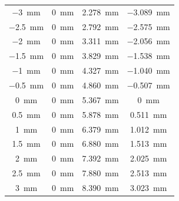 \begin{table}[ht]
\begin{tabular}{| c | c | c | c |}
        \hline


        \SI{-3}{mm}           & \SI{0}{mm}     & \SI{2.278}{mm}      & \SI{-3.089}{mm}   \\
        \SI{-2.5}{mm}         & \SI{0}{mm}     & \SI{2.792}{mm}      & \SI{-2.575}{mm}   \\
        \SI{-2}{mm}           & \SI{0}{mm}     & \SI{3.311}{mm}      & \SI{-2.056}{mm}   \\
        \SI{-1.5}{mm}         & \SI{0}{mm}     & \SI{3.829}{mm}      & \SI{-1.538}{mm}   \\
        \SI{-1}{mm}           & \SI{0}{mm}     & \SI{4.327}{mm}      & \SI{-1.040}{mm}   \\
        \SI{-0.5}{mm}         & \SI{0}{mm}     & \SI{4.860}{mm}      & \SI{-0.507}{mm}   \\
        \SI{0}{mm}            & \SI{0}{mm}     & \SI{5.367}{mm}      & \SI{0}{mm}        \\
        \SI{0.5}{mm}          & \SI{0}{mm}     & \SI{5.878}{mm}      & \SI{0.511}{mm}    \\
        \SI{1}{mm}            & \SI{0}{mm}     & \SI{6.379}{mm}      & \SI{1.012}{mm}    \\
        \SI{1.5}{mm}          & \SI{0}{mm}     & \SI{6.880}{mm}      & \SI{1.513}{mm}    \\
        \SI{2}{mm}            & \SI{0}{mm}     & \SI{7.392}{mm}      & \SI{2.025}{mm}    \\
        \SI{2.5}{mm}          & \SI{0}{mm}     & \SI{7.880}{mm}      & \SI{2.513}{mm}    \\
        \SI{3}{mm}            & \SI{0}{mm}     & \SI{8.390}{mm}      & \SI{3.023}{mm}    \\

        \hline



\end{tabular}
\end{table}
